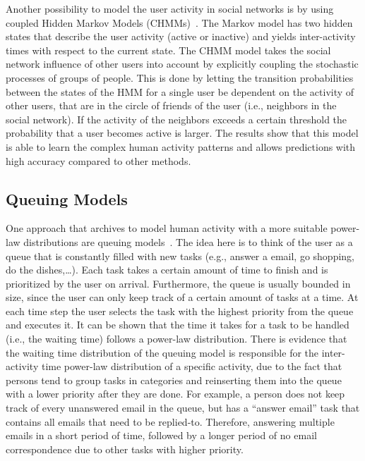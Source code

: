 Another possibility to model the user activity in social networks is by using coupled Hidden Markov Models (CHMMs)~\cite{Raghavan2013}.
The Markov model has two hidden states that describe the user activity (active or inactive) and yields inter-activity times with respect to the current state.
The CHMM model takes the social network influence of other users into account by explicitly coupling the stochastic processes of groups of people.
This is done by letting the transition probabilities between the states of the HMM for a single user be dependent on the activity of other users, that are in the circle of friends of the user (i.e., neighbors in the social network).
If the activity of the neighbors exceeds a certain threshold the probability that a user becomes active is larger.
The results show that this model is able to learn the complex human activity patterns and allows predictions with high accuracy compared to other methods.

\subsection{Queuing Models}

One approach that archives to model human activity with a more suitable power-law distributions are queuing models~\cite{Vazquez2006}.
The idea here is to think of the user as a queue that is constantly filled with new tasks (e.g., answer a email, go shopping, do the dishes,\ldots).
Each task takes a certain amount of time to finish and is prioritized by the user on arrival.
Furthermore, the queue is usually bounded in size, since the user can only keep track of a certain amount of tasks at a time.
At each time step the user selects the task with the highest priority from the queue and executes it.
It can be shown that the time it takes for a task to be handled (i.e., the waiting time) follows a power-law distribution.
There is evidence that the waiting time distribution of the queuing model is responsible for the inter-activity time power-law distribution of a specific activity, due to the fact that persons tend to group tasks in categories and reinserting them into the queue with a lower priority after they are done.
For example, a person does not keep track of every unanswered email in the queue, but has a \enquote{answer email} task that contains all emails that need to be replied-to.
Therefore, answering multiple emails in a short period of time, followed by a longer period of no email correspondence due to other tasks with higher priority.

